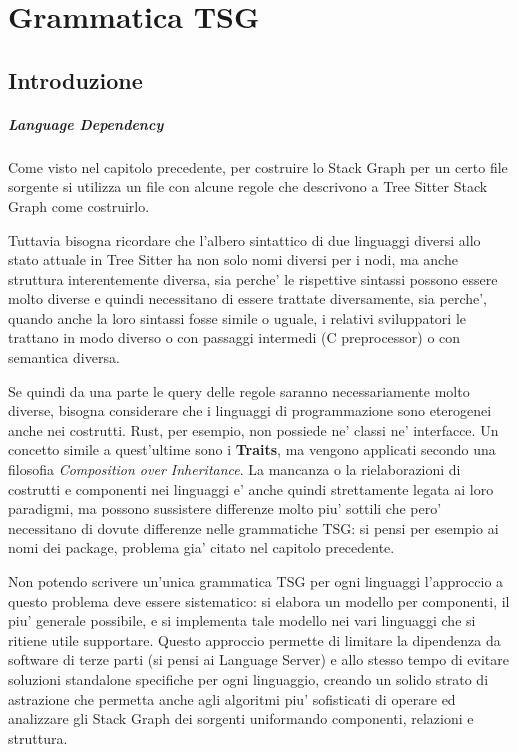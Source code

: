 \chapter{Grammatica TSG}

\section{Introduzione}

\paragraph{Language Dependency}

Come visto nel capitolo precedente, per costruire lo Stack Graph per un certo file sorgente si utilizza un file con alcune regole che descrivono a Tree Sitter Stack Graph come costruirlo.

\par
Tuttavia bisogna ricordare che l'albero sintattico di due linguaggi diversi allo stato attuale in Tree Sitter ha non solo nomi diversi per i nodi, ma anche struttura interentemente diversa, sia perche' le rispettive sintassi possono essere molto diverse e quindi necessitano di essere trattate diversamente, sia perche', quando anche la loro sintassi fosse simile o uguale, i relativi sviluppatori le trattano in modo diverso o con passaggi intermedi (C preprocessor) o con semantica diversa.

\par
Se quindi da una parte le query delle regole saranno necessariamente molto diverse, bisogna considerare che i linguaggi di programmazione sono eterogenei anche nei costrutti.
Rust, per esempio, non possiede ne' classi ne' interfacce. Un concetto simile a quest'ultime sono i \textbf{Traits}, ma vengono applicati secondo una filosofia \emph{Composition over Inheritance}.
La mancanza o la rielaborazioni di costrutti e componenti nei linguaggi e' anche quindi strettamente legata ai loro paradigmi, ma possono sussistere differenze molto piu' sottili che pero' necessitano di dovute differenze nelle grammatiche TSG: si pensi per esempio ai nomi dei package, problema gia' citato nel capitolo precedente.

\par
Non potendo scrivere un'unica grammatica TSG per ogni linguaggi l'approccio a questo problema deve essere sistematico: si elabora un modello per componenti, il piu' generale possibile, e si implementa tale modello nei vari linguaggi che si ritiene utile supportare.
Questo approccio permette di limitare la dipendenza da software di terze parti (si pensi ai Language Server) e allo stesso tempo di evitare soluzioni standalone specifiche per ogni linguaggio, creando un solido strato di astrazione che permetta anche agli algoritmi piu' sofisticati di operare ed analizzare gli Stack Graph dei sorgenti uniformando componenti, relazioni e struttura.

